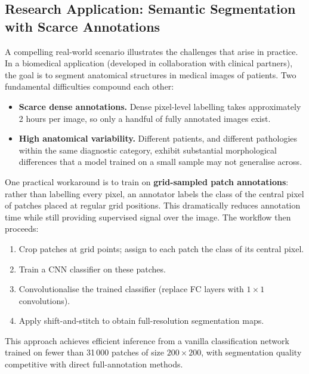 \documentclass[11pt,a4paper]{article}
\begin{document}
\subsection{Research Application: Semantic Segmentation with Scarce Annotations}
\label{sec:semseg_research}

A compelling real-world scenario illustrates the challenges that arise in practice. In a biomedical application (developed in collaboration with clinical partners), the goal is to segment anatomical structures in medical images of patients. Two fundamental difficulties compound each other:

\begin{itemize}
  \item \textbf{Scarce dense annotations.} Dense pixel-level labelling takes approximately 2 hours per image, so only a handful of fully annotated images exist.
  \item \textbf{High anatomical variability.} Different patients, and different pathologies within the same diagnostic category, exhibit substantial morphological differences that a model trained on a small sample may not generalise across.
\end{itemize}

One practical workaround is to train on \textbf{grid-sampled patch annotations}: rather than labelling every pixel, an annotator labels the class of the central pixel of patches placed at regular grid positions. This dramatically reduces annotation time while still providing supervised signal over the image. The workflow then proceeds:

\begin{enumerate}
  \item Crop patches at grid points; assign to each patch the class of its central pixel.
  \item Train a CNN classifier on these patches.
  \item Convolutionalise the trained classifier (replace FC layers with $1\times 1$ convolutions).
  \item Apply shift-and-stitch to obtain full-resolution segmentation maps.
\end{enumerate}

This approach achieves efficient inference from a vanilla classification network trained on fewer than 31\,000 patches of size $200\times 200$, with segmentation quality competitive with direct full-annotation methods.
\end{document}
